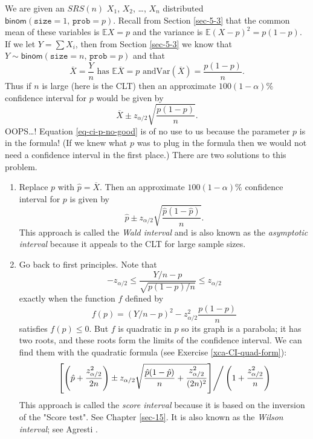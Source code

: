 We are given an \(SRS(n)\) \(X_{1}\), \(X_{2}\), \ldots{}, \(X_{n}\)
distributed
\(\mathsf{binom}(\mathtt{size}=1,\,\mathtt{prob}=p)\). Recall from
Section \ref{sec-5-3} that the common mean of these variables
is \(\mathbb{E} X=p\) and the variance is
\(\mathbb{E}(X-p)^{2}=p(1-p)\). If we let \(Y=\sum X_{i}\), then from
Section \ref{sec-5-3} we know that
\(Y\sim\mathsf{binom}(\mathtt{size}=n,\,\mathtt{prob}=p)\) and that \[
\overline{X}=\frac{Y}{n}\mbox{ has }\mathbb{E}\overline{X}=p\mbox{ and
}\mathrm{Var}(\overline{X})=\frac{p(1-p)}{n}.  \] Thus if \(n\) is
large (here is the CLT) then an approximate \(100(1-\alpha)\%\)
confidence interval for \(p\) would be given by
\begin{equation}
\label{eq-ci-p-no-good}
\overline{X}\pm z_{\alpha/2}\sqrt{\frac{p(1-p)}{n}}.
\end{equation}
OOPS\ldots{}! Equation \eqref{eq-ci-p-no-good} is of no use to us because the
 parameter \(p\) is in the formula! (If we knew what
\(p\) was to plug in the formula then we would not need a confidence
interval in the first place.) There are two solutions to this problem.
\begin{enumerate}
\item Replace \(p\) with \(\hat{p}=\overline{X}\). Then an approximate
\(100(1-\alpha)\%\) confidence interval for \(p\) is given by
\begin{equation}
\hat{p}\pm z_{\alpha/2}\sqrt{\frac{\hat{p}(1-\hat{p})}{n}}.
\end{equation}
This approach is called the \emph{Wald interval} and is also known as
the \emph{asymptotic interval} because it appeals to the CLT for large
sample sizes.
\item Go back to first principles. Note that \[
   -z_{\alpha/2}\leq\frac{Y/n-p}{\sqrt{p(1-p)/n}}\leq z_{\alpha/2} \]
exactly when the function \(f\) defined by \[
   f(p)=\left(Y/n-p\right)^{2}-z_{\alpha/2}^{2}\frac{p(1-p)}{n} \]
satisfies \(f(p)\leq0\). But \(f\) is quadratic in \(p\) so its
graph is a parabola; it has two roots, and these roots form the
limits of the confidence interval. We can find them with the
quadratic formula (see Exercise \ref{xca-CI-quad-form}):
\begin{equation}
\left.\left[\left(\hat{p}+\frac{z_{\alpha/2}^{2}}{2n}\right)\pm z_{\alpha/2}\sqrt{\frac{\hat{p}(1-\hat{p})}{n}+\frac{z_{\alpha/2}^{2}}{(2n)^{2}}}\right]\right/ \left(1+\frac{z_{\alpha/2}^{2}}{n}\right)
\end{equation}
This approach is called the \emph{score interval} because it is based on
the inversion of the "Score test". See Chapter
\ref{sec-15}. It is also known as the \emph{Wilson
interval}; see Agresti \cite{Agresti2002}.
\end{enumerate}


